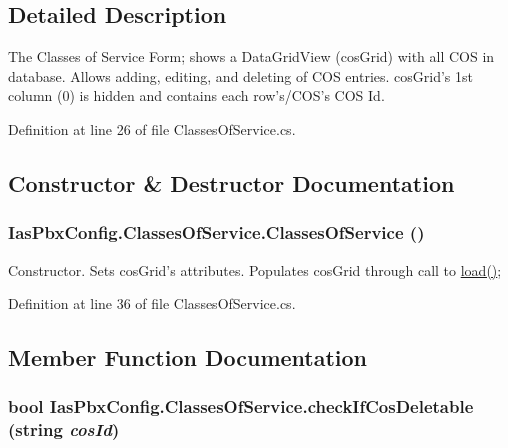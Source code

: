 \subsection{Detailed Description}
The Classes of Service Form; shows a DataGridView (cosGrid) with all COS in database. Allows adding, editing, and deleting of COS entries. cosGrid's 1st column (0) is hidden and contains each row's/COS's COS Id. 

Definition at line 26 of file ClassesOfService.cs.

\subsection{Constructor \& Destructor Documentation}
\hypertarget{class_ias_pbx_config_1_1_classes_of_service_a5ee02eb862c50aaaa88efed9c438ccd8}{
\subsubsection[{ClassesOfService}]{\setlength{\rightskip}{0pt plus 5cm}IasPbxConfig.ClassesOfService.ClassesOfService ()}}
\label{class_ias_pbx_config_1_1_classes_of_service_a5ee02eb862c50aaaa88efed9c438ccd8}


Constructor. Sets cosGrid's attributes. Populates cosGrid through call to \hyperlink{class_ias_pbx_config_1_1_classes_of_service_afe758d8a2d66ee16d2c23401a6c62894}{load()}; 

Definition at line 36 of file ClassesOfService.cs.

\subsection{Member Function Documentation}
\hypertarget{class_ias_pbx_config_1_1_classes_of_service_a1c71bf32df4e9f1c83dfb22383f54188}{
\subsubsection[{checkIfCosDeletable}]{\setlength{\rightskip}{0pt plus 5cm}bool IasPbxConfig.ClassesOfService.checkIfCosDeletable (string {\em cosId})}}
\label{class_ias_pbx_config_1_1_classes_of_service_a1c71bf32df4e9f1c83dfb22383f54188}


